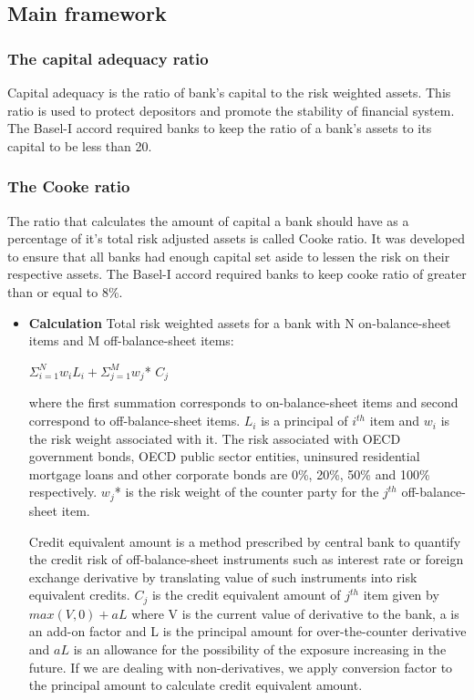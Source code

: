 \documentclass[11pt]{article}
\numberwithin{equation}{section}
\begin{document}
\subsection{Main framework}
\medskip

\subsubsection{The capital adequacy ratio}
\medskip

Capital adequacy is the ratio of bank's capital to the risk weighted assets. This ratio is used to protect depositors and promote the stability of financial system. The Basel-I accord required banks to keep the ratio of a bank’s assets to its capital to be less than 20.

\subsubsection{The Cooke ratio}
\medskip

The ratio that calculates the amount of capital a bank should have as a percentage of it's total risk adjusted assets is called Cooke ratio. It was developed to ensure that all banks had enough capital set aside to lessen the risk on their respective assets. The Basel-I accord required banks to keep cooke ratio of greater than or equal to 8\%. 
\begin{itemize}
\item\textbf{Calculation}
Total risk weighted assets for a bank with N on-balance-sheet items and M off-balance-sheet items: 
\begin{center}
$ \Sigma_{i=1}^{N} w_i L_i + \Sigma_{j=1}^{M} w_j$* $C_j $ 
\end{center}
where the first summation corresponds to on-balance-sheet items and second correspond to off-balance-sheet items. $L_i$ is a principal of $i^{th}$ item and $w_i$ is the risk weight associated with it. The risk associated with OECD government bonds, OECD public sector entities, uninsured residential mortgage loans and other corporate bonds are  0\%, 20\%, 50\% and 100\%  respectively. $w_j$* is the risk weight of the counter party for the $j^{th}$ off-balance-sheet item.\medskip

\hspace{1cm}Credit equivalent amount is a method prescribed by central bank to quantify the credit risk of off-balance-sheet instruments such as interest rate or foreign exchange derivative by translating value of such instruments into risk equivalent credits. $C_j$ is the credit equivalent amount of $j^{th}$ item given by $ max(V,0)+aL $ where V is the current value of derivative to the bank, a is an add-on factor and L is the principal amount for over-the-counter derivative and $aL$ is an allowance for the possibility of the exposure increasing in the future. If we are dealing with non-derivatives, we apply conversion factor to the principal amount to calculate credit equivalent amount.   

\end{itemize}
\end{document}
